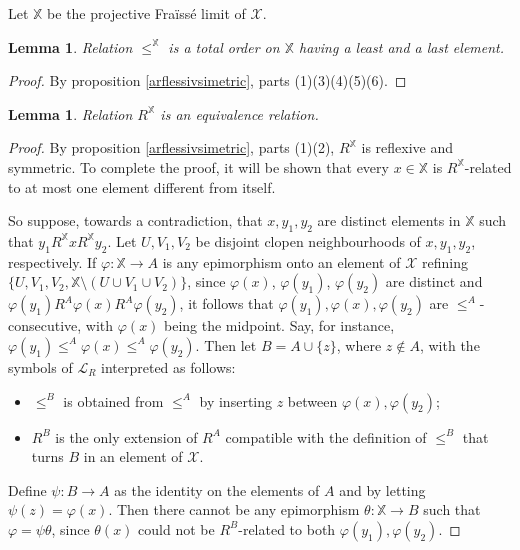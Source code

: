 \documentclass[12pt,twoside,a4paper]{amsart}
\theoremstyle{plain}
\newtheorem{lemma}[theorem]{Lemma}
\theoremstyle{definition}
\begin{document}
Let $ \mathbb X $ be the projective Fra\"iss\'e limit of $ \mathcal X $.

\begin{lemma} \label{ordinconminemass}
Relation $\leq^{ \mathbb X }$ is a total order on $ \mathbb X $ having a least and a last element.
\end{lemma}

\begin{proof}
By proposition \ref{arflessivsimetric}, parts (1)(3)(4)(5)(6).
\end{proof}

\begin{lemma}
Relation $R^{ \mathbb X }$ is an equivalence relation.
\end{lemma}

\begin{proof}
By proposition \ref{arflessivsimetric}, parts (1)(2), $R^{ \mathbb X }$ is reflexive and symmetric.
To complete the proof, it will be shown that every $x\in \mathbb X $ is $R^{ \mathbb X }$-related to at most one element different from itself.

\sloppypar
So suppose, towards a contradiction, that $x,y_1,y_2$ are distinct elements in $ \mathbb X $ such that $y_1R^{ \mathbb X }xR^{ \mathbb X }y_2$.
Let $U,V_1,V_2$ be disjoint clopen neighbourhoods of $x,y_1,y_2$, respectively.
If $ {\varphi} : \mathbb X \to A$ is any epimorphism onto an element of $ \mathcal X $ refining $\{ U,V_1,V_2, \mathbb X \setminus (U\cup V_1\cup V_2)\} $, since $ {\varphi} (x)$, $ {\varphi} (y_1)$, $ {\varphi} (y_2)$ are distinct and $ {\varphi} (y_1)R^A {\varphi} (x)R^A {\varphi} (y_2)$, it follows that $ {\varphi} (y_1), {\varphi} (x), {\varphi} (y_2)$ are $\leq^A$-consecutive, with $ {\varphi} (x)$ being the midpoint.
Say, for instance, $ {\varphi} (y_1)\leq^A {\varphi} (x)\leq^A {\varphi} (y_2)$.
Then let $B=A\cup\{ z\} $, where $z\notin A$, with the symbols of $ \mathcal L_R$ interpreted as follows:
\begin{itemize}
\item $\leq^B$ is obtained from $\leq^A$ by inserting $z$ between $ {\varphi} (x), {\varphi} (y_2)$;
\item $R^B$ is the only extension of $R^A$ compatible with the definition of $\leq^B$ that turns $B$ in an element of $ \mathcal X $.
\end{itemize}
Define $\psi :B\to A$ as the identity on the elements of $A$ and by letting $ \psi (z)= {\varphi} (x)$.
Then there cannot be any epimorphism $\theta : \mathbb X \to B$ such that $ {\varphi} =\psi\theta $, since $ \theta (x)$ could not be $R^B$-related to both $ {\varphi} (y_1), {\varphi} (y_2)$.
\end{proof}
\end{document}
